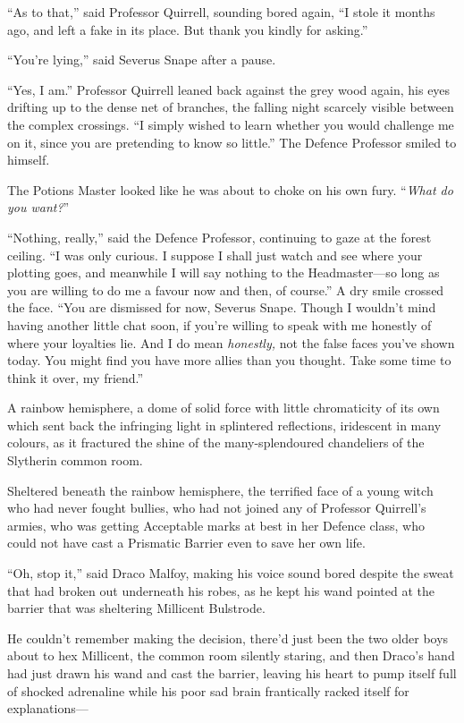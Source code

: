 “As to that,” said Professor Quirrell, sounding bored again, “I stole it months ago, and left a fake in its place. But thank you kindly for asking.”

“You’re lying,” said Severus Snape after a pause.

“Yes, I am.” Professor Quirrell leaned back against the grey wood again, his eyes drifting up to the dense net of branches, the falling night scarcely visible between the complex crossings. “I simply wished to learn whether you would challenge me on it, since you are pretending to know so little.” The Defence Professor smiled to himself.

The Potions Master looked like he was about to choke on his own fury. “\emph{What do you want?}”

“Nothing, really,” said the Defence Professor, continuing to gaze at the forest ceiling. “I was only curious. I suppose I shall just watch and see where your plotting goes, and meanwhile I will say nothing to the Headmaster—so long as you are willing to do me a favour now and then, of course.” A dry smile crossed the face. “You are dismissed for now, Severus Snape. Though I wouldn’t mind having another little chat soon, if you’re willing to speak with me honestly of where your loyalties lie. And I do mean \emph{honestly,} not the false faces you’ve shown today. You might find you have more allies than you thought. Take some time to think it over, my friend.”


A rainbow hemisphere, a dome of solid force with little chromaticity of its own which sent back the infringing light in splintered reflections, iridescent in many colours, as it fractured the shine of the many-splendoured chandeliers of the Slytherin common room.

Sheltered beneath the rainbow hemisphere, the terrified face of a young witch who had never fought bullies, who had not joined any of Professor Quirrell’s armies, who was getting Acceptable marks at best in her Defence class, who could not have cast a Prismatic Barrier even to save her own life.

“Oh, stop it,” said Draco Malfoy, making his voice sound bored despite the sweat that had broken out underneath his robes, as he kept his wand pointed at the barrier that was sheltering Millicent Bulstrode.

He couldn’t remember making the decision, there’d just been the two older boys about to hex Millicent, the common room silently staring, and then Draco’s hand had just drawn his wand and cast the barrier, leaving his heart to pump itself full of shocked adrenaline while his poor sad brain frantically racked itself for explanations—

